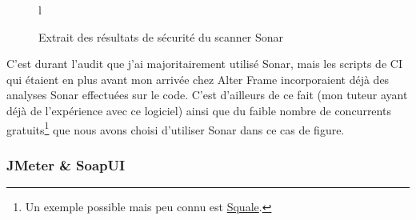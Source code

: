 \begin{figure}{l}
	\caption{Extrait des résultats de sécurité du scanner Sonar}
	\label{fig:sonar_sec}
\end{figure}

C'est durant l'audit que j'ai majoritairement utilisé Sonar, mais les scripts de CI qui étaient en plus avant mon arrivée chez Alter Frame incorporaient déjà des analyses Sonar effectuées sur le code. C'est d'ailleurs de ce fait (mon tuteur ayant déjà de l'expérience avec ce logiciel) ainsi que du faible nombre de concurrents gratuits\footnote{Un exemple possible mais peu connu est \href{http://www.squale.org/}{Squale}.} que nous avons choisi d'utiliser Sonar dans ce cas de figure.

\subsubsection{JMeter \& SoapUI}

